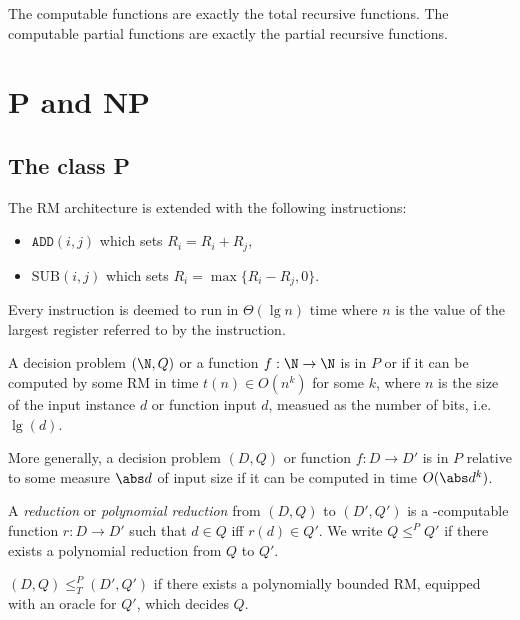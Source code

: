 \documentclass{article}
\begin{document}
\begin{theorem}[Notes I.45]
	The computable functions are exactly the total recursive functions. The computable partial functions
	are exactly the partial recursive functions.
\end{theorem}

\section{P and NP}

\subsection{The class P}

\begin{definition}
	The RM architecture is extended with the following instructions:
	\begin{itemize}
		\item $\texttt{ADD}(i,j)$ which sets $R_i=R_i+R_j$,
		\item $\text{SUB}(i,j)$ which sets $R_i=\max\{R_i-R_j,0\}$.
	\end{itemize}
	Every instruction is deemed to run in $\Theta(\lg n)$ time where $n$
	is the value of the largest register referred to by the instruction.
\end{definition}


\begin{definition}
	A decision problem $(\N,Q)$ or a function $f:\N\to\N$ is in $P$ or \ptime if
	it can be computed by some RM in time $t(n)\in O(n^k)$ for some $k$, where $n$ is the size
	of the input instance $d$ or function input $d$, measued as the number of bits, i.e. $\lg(d)$.

	More generally, a decision problem $(D,Q)$ or function $f:D\to D'$ is in $P$ relative to some
	measure $\abs d$ of input size if it can be computed in time $O(\abs d^k)$.
\end{definition}

\begin{definition}
	A \ptime \emph{reduction} or \emph{polynomial reduction} from $(D,Q)$ to $(D',Q')$ is
	a \ptime-computable function $r:D\to D'$ such that $d\in Q$ iff $r(d)\in Q'$.
	We write $Q\leq^P Q'$ if there exists a polynomial reduction from $Q$ to $Q'$.
\end{definition}

\begin{definition}
	$(D,Q)\leq^P_T (D',Q')$ if there exists a polynomially bounded RM, equipped with an oracle
	for $Q'$, which decides $Q$.
\end{definition}
\end{document}

